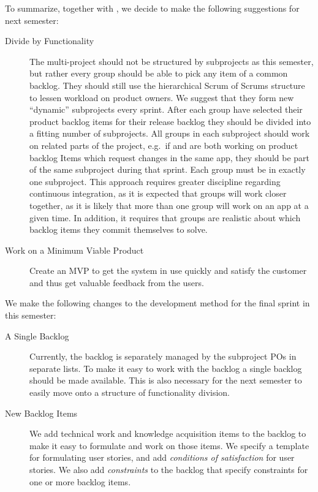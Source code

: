 To summarize, together with , we decide to make the following suggestions for next semester:

\begin{description}
  \item[Divide by Functionality] The multi-project should not be structured by subprojects as this semester, but rather every group should be able to pick any item of a common backlog. They should still use the hierarchical Scrum of Scrums structure to lessen workload on product owners. We suggest that they form new ``dynamic'' subprojects every sprint. After each group have selected their product backlog items for their release backlog they should be divided into a fitting number of subprojects. All groups in each subproject should work on related parts of the project, e.g.\ if  and  are both working on product backlog Items which request changes in the same app, they should be part of the same subproject during that sprint. Each group must be in exactly one subproject. This approach requires greater discipline regarding continuous integration, as it is expected that groups will work closer together, as it is likely that more than one group will work on an app at a given time. In addition, it requires that groups are realistic about which backlog items they commit themselves to solve.
  \item[Work on a Minimum Viable Product] Create an MVP to get the system in use quickly and satisfy the customer and thus get valuable feedback from the users.
\end{description}

We make the following changes to the development method for the final sprint in this semester:

\begin{description}
  \item[A Single Backlog] Currently, the backlog is separately managed by the subproject POs in separate lists. To make it easy to work with the backlog a single backlog should be made available. This is also necessary for the next semester to easily move onto a structure of functionality division.
  \item[New Backlog Items] We add technical work and knowledge acquisition items to the backlog to make it easy to formulate and work on those items. We specify a template for formulating user stories, and add \emph{conditions of satisfaction} for user stories. We also add \emph{constraints} to the backlog that specify constraints for one or more backlog items.
\end{description}

